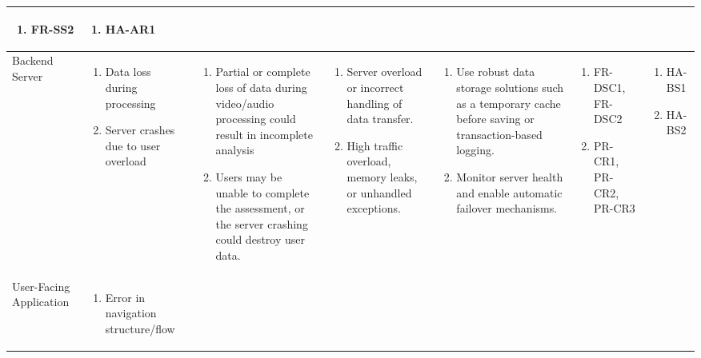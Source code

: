 \documentclass{article}
\begin{document}
\begin{landscape}
\begin{longtable}{|p{3cm}|p{3cm}|p{4cm}|p{4cm}|p{3cm}|p{2cm}|p{3cm}|}
\begin{enumerate}[leftmargin=*]
       \item FR-SS2
  \end{enumerate} &
  \begin{enumerate}[leftmargin=*]
       \item HA-AR1
  \end{enumerate} \\
  \hline
  Backend Server & 
  \begin{enumerate}[leftmargin=*]
      \item Data loss during processing
      \item Server crashes due to user overload
  \end{enumerate} & 
  \begin{enumerate}[leftmargin=*]
      \item Partial or complete loss of data during video/audio processing could result in incomplete analysis
      \item Users may be unable to complete the assessment, or the server crashing could destroy user data.
  \end{enumerate} &
  \begin{enumerate}[leftmargin=*]
       \item Server overload or incorrect handling of data transfer.
       \item High traffic overload, memory leaks, or unhandled exceptions.
  \end{enumerate} &
  \begin{enumerate}[leftmargin=*]
       \item Use robust data storage solutions such as a temporary cache before saving or transaction-based logging.
       \item Monitor server health and enable automatic failover mechanisms.
  \end{enumerate} &
  \begin{enumerate}[leftmargin=*]
       \item FR-DSC1, FR-DSC2
       \item PR-CR1, PR-CR2, PR-CR3
  \end{enumerate} &
  \begin{enumerate}[leftmargin=*]
       \item HA-BS1
       \item HA-BS2
  \end{enumerate} \\
  \hline
  User-Facing Application & 
  \begin{enumerate}[leftmargin=*]
      \item Error in navigation structure/flow

\end{enumerate}
\end{longtable}
\end{landscape}
\end{document}

